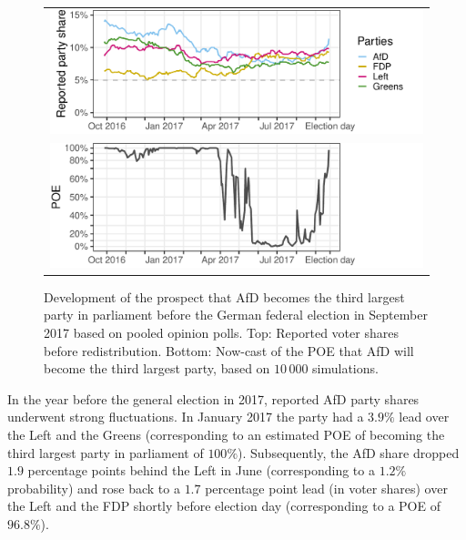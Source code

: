 \documentclass[smallextended]{svjour3}      %
\begin{document}
\begin{figure}[H]\centering
\begin{tabular}{l}
\includegraphics[height=.3\textwidth]{figures/2017_pooled_afd_rawShares.pdf}
\\
\includegraphics[height=.3\textwidth]{figures/2017_pooled_afd_thirdPartyProb.pdf}
\end{tabular}
\caption{Development of the prospect that AfD becomes the third largest party
in parliament before the German federal election in September 2017 based on pooled
opinion polls.
Top: Reported voter shares before redistribution.
Bottom: Now-cast of the POE that AfD will become the third largest party,
based on $10\,000$ simulations.
\label{fig:2017_afd}
}
\end{figure}

In the year before the general election in 2017, reported AfD party shares
underwent strong fluctuations. In January 2017 the party had a $3.9\%$ lead
over the Left and the Greens (corresponding to an estimated POE of
becoming the third largest party in parliament of $100\%$). Subsequently, the
AfD share dropped $1.9$ percentage points behind the Left in June
(corresponding to a $1.2\%$ probability)
and rose back to a $1.7$ percentage point lead (in voter shares) over the Left
and the FDP shortly before election day (corresponding to a POE of $96.8\%$).
\end{document}
